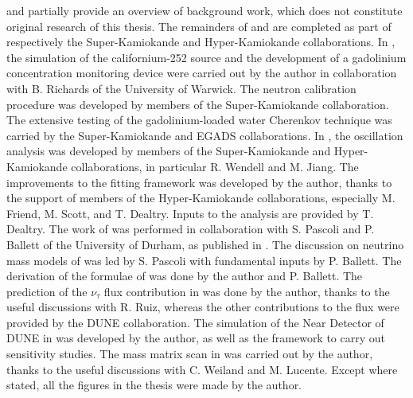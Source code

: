  and partially  provide an overview of background work, %
which does not constitute original research of this thesis.
The remainders of  and  are completed %
as part of respectively the Super-Kamiokande and Hyper-Kamiokande collaborations.
In , the simulation of the californium-252 source and the development %
of a gadolinium concentration monitoring device were carried out by the author in collaboration with %
B. Richards of the University of Warwick.
The neutron calibration procedure was developed by members of the Super-Kamiokande collaboration. 
The extensive testing of the gadolinium-loaded water Cherenkov technique was carried by the Super-Kamiokande and EGADS collaborations.
In , the oscillation analysis was developed by members of the Super-Kamiokande and Hyper-Kamiokande collaborations, %
in particular R. Wendell and M. Jiang.
The improvements to the fitting framework was developed by the author, thanks to the support of members of the Hyper-Kamiokande collaborations, %
especially M. Friend, M. Scott, and T. Dealtry.
Inputs to the analysis are provided by T. Dealtry.
The work of  was performed in collaboration with %
S. Pascoli and P. Ballett of the University of Durham, as published in .
The discussion on neutrino mass models of  was led by S. Pascoli with %
fundamental inputs by P. Ballett.
The derivation of the formulae of  was done by the author and P. Ballett.
The prediction of the $\nu_\tau$ flux contribution in  was done by the author, %
thanks to the useful discussions with R. Ruiz, %
whereas the other contributions to the flux were provided by the DUNE collaboration.
The simulation of the Near Detector of DUNE in  was developed by the author, %
as well as the framework to carry out sensitivity studies.
The mass matrix scan in  was carried out by the author, thanks to the %
useful discussions with C. Weiland and M. Lucente.
Except where stated, all the figures in the thesis were made by the author.

